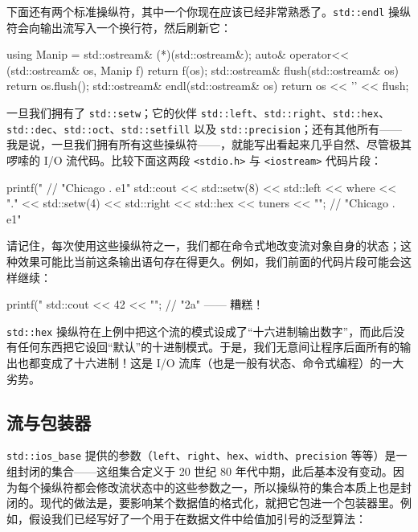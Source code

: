 下面还有两个标准操纵符，其中一个你现在应该已经非常熟悉了。\texttt{std::\allowbreak{}endl} 操纵符会向输出流写入一个换行符，然后刷新它：

\begin{codebox}[cpp]
    using Manip = std::ostream& (*)(std::ostream&);
    auto& operator<< (std::ostream& os, Manip f) {
      return f(os);
    }
    std::ostream& flush(std::ostream& os) {
      return os.flush();
    }
    std::ostream& endl(std::ostream& os) {
      return os << '\n' << flush;
    }
\end{codebox}

一旦我们拥有了 \texttt{std::\allowbreak{}setw}；它的伙伴 \texttt{std::\allowbreak{}left}、\texttt{std::\allowbreak{}right}、\texttt{std::\allowbreak{}hex}、\texttt{std::\allowbreak{}dec}、\texttt{std::\allowbreak{}oct}、\texttt{std::\allowbreak{}setfill} 以及 \texttt{std::\allowbreak{}precision}；还有其他所有——我是说，一旦我们拥有所有这些操纵符——，就能写出看起来几乎自然、尽管极其啰嗦的 I/O 流代码。比较下面这两段 \texttt{<stdio.\allowbreak{}h>\allowbreak{}} 与 \texttt{<iostream>\allowbreak{}} 代码片段：

\begin{codebox}[cpp]
    printf("%
      // "Chicago . e1"
    std::cout << std::setw(8) << std::left << where << "."
              << std::setw(4) << std::right << std::hex
              << tuners << "\n";
      // "Chicago . e1"
\end{codebox}

请记住，每次使用这些操纵符之一，我们都在命令式地改变流对象自身的状态；这种效果可能比当前这条输出语句存在得更久。例如，我们前面的代码片段可能会这样继续：

\begin{codebox}[cpp]
    printf("%
    std::cout << 42 << "\n"; // "2a" —— 糟糕！
\end{codebox}

\texttt{std::\allowbreak{}hex} 操纵符在上例中把这个流的模式设成了“十六进制输出数字”，而此后没有任何东西把它设回“默认”的十进制模式。于是，我们无意间让程序后面所有的输出也都变成了十六进制！这是 I/O 流库（也是一般有状态、命令式编程）的一大劣势。

\subsection{流与包装器}

\texttt{std::\allowbreak{}ios\_\allowbreak{}base} 提供的参数（\texttt{left}、\texttt{right}、\texttt{hex}、\texttt{width}、\texttt{precision} 等等）是一组封闭的集合——这组集合定义于 20 世纪 80 年代中期，此后基本没有变动。因为每个操纵符都会修改流状态中的这些参数之一，所以操纵符的集合本质上也是封闭的。现代的做法是，要影响某个数据值的格式化，就把它包进一个包装器里。例如，假设我们已经写好了一个用于在数据文件中给值加引号的泛型算法：

